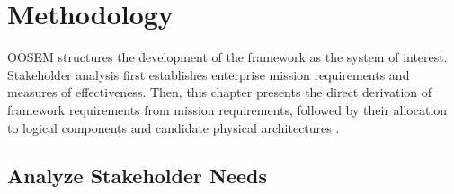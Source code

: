 \chapter{Methodology}
\label{ch:solucion}

OOSEM structures the development of the framework as the system of interest. Stakeholder analysis first establishes enterprise mission requirements and measures of effectiveness. Then, this chapter presents the direct derivation of framework requirements from mission requirements, followed by their allocation to logical components and candidate physical architectures \citep[Chap.~17]{friedenthal2014practical}.

\section{Analyze Stakeholder Needs}
\label{sec:analyze-stakeholder-needs}







